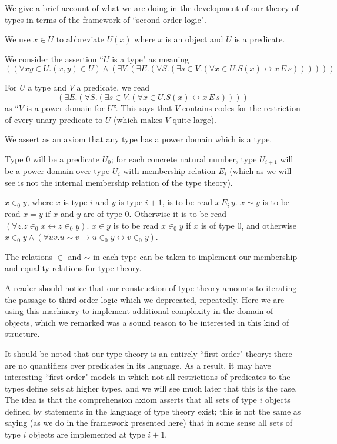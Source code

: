 \documentclass[12pt]{book}
\begin{document}
We give a brief account of what we are doing in the development of our theory of types in terms of the framework of ``second-order logic".

We use $x \in U$ to abbreviate $U(x)$ where $x$ is an object and $U$ is a predicate.

We consider the assertion ``$U$ is a type" as meaning $$((\forall xy \in U.(x,y)\in U) \wedge (\exists V.(\exists E.(\forall S.(\exists s \in V.(\forall x \in U.S(x) \leftrightarrow x \,E\,s))))))$$

For $U$ a type and $V$ a predicate, we read $$(\exists E.(\forall S.(\exists s \in V.(\forall x \in U.S(x) \leftrightarrow x \,E\,s))))$$ as
``$V$ is a power domain for $U$''.   This says that $V$ contains codes for the restriction of every unary predicate to $U$ (which makes
$V$ quite large).

We assert as an axiom that any type has a power domain which is a type.

Type 0 will be a predicate $U_0$; for each concrete natural number, type $U_{i+1}$ will be a power domain over type $U_i$
with membership relation $E_i$ (which as we will see is not the internal membership relation of the type theory).

$x \in_0 y$, where $x$ is type $i$ and $y$ is type $i+1$, is to be read $x\,E_i \,y$.  $x\sim y$ is to be read $x=y$ if $x$
and $y$ are of type 0.  Otherwise it is to be read $(\forall z.z \in_0 x \leftrightarrow z \in_0 y)$.  $x \in y$ is to be read
$x \in_0 y$ if $x$ is of type 0, and otherwise $x \in_0 y \wedge (\forall uv.u\sim v \rightarrow u \in_0 y \leftrightarrow v \in_0 y)$.

The relations $\in$ and $\sim$ in each type can be taken to implement our membership and equality relations for type theory.

A reader should notice that our construction of type theory amounts to iterating the passage to third-order logic which we deprecated, repeatedly.  Here we are using this machinery to implement additional complexity in the domain of objects, which we remarked was a sound reason to be interested in this kind of structure.

It should be noted that our type theory is an entirely ``first-order" theory:  there are no quantifiers over predicates in its language.  As a result, it may have interesting ``first-order" models in which not all restrictions of predicates to the types define sets at higher types, and we will see much later that this is the case.  The idea is that the comprehension axiom asserts that all sets of type $i$ objects defined by statements in the language of type theory
exist; this is not the same as saying (as we do in the framework presented here) that in some sense all sets of type $i$ objects are implemented
at type $i+1$.
\end{document}
